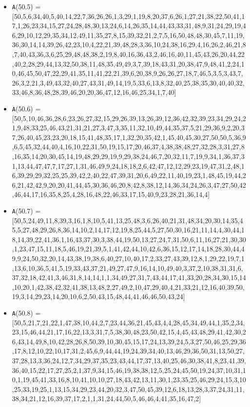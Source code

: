 \documentclass[runningheads,a4paper]{llncs}
\begin{document}
\begin{itemize}
	\item {\texttt A(50.5) = } [50,5,6,34,40,5,40,14,22,7,36,26,26,1,3,29,1,19,8,20,37,6,26,1,27,21,38,22,50,41,17,1,26,23,34,15,27,24,28,48,30,13,24,6,14,26,35,14,44,43,33,31,48,9,31,24,29,19,46,29,10,12,29,35,34,12,49,11,35,27,8,15,39,32,21,2,7,5,16,50,48,48,30,45,7,11,19,36,30,14,14,39,26,42,23,10,4,22,21,39,48,28,3,36,10,24,38,16,29,4,16,26,2,46,21,8,7,40,43,36,3,6,25,29,48,48,38,2,19,8,40,16,36,43,2,46,16,40,11,45,43,26,20,44,22,40,2,28,29,44,13,32,50,38,11,48,35,49,49,3,7,39,18,43,31,20,38,47,9,48,41,2,24,10,46,45,50,47,22,29,41,35,11,41,22,21,39,6,20,38,9,26,26,27,18,7,46,5,3,5,3,43,7,26,3,2,21,3,49,43,32,40,27,43,31,49,14,19,5,33,6,13,8,32,40,25,38,35,30,40,40,32,33,46,8,36,48,28,39,46,20,20,36,47,12,16,46,25,34,1,7,40]
	
	\item {\texttt A(50.6) = } [50,5,10,46,36,28,6,23,26,27,32,15,29,26,39,13,26,39,12,36,42,32,39,23,34,29,24,21,9,48,33,25,46,43,21,31,21,27,3,47,3,35,11,32,10,49,44,35,37,5,21,29,36,9,2,20,37,26,40,45,23,23,20,18,15,41,48,35,17,1,32,20,35,42,1,45,40,45,30,27,50,50,5,36,9,6,5,45,32,44,40,4,16,10,22,31,50,19,15,17,20,46,37,4,38,38,48,27,32,28,3,31,27,8,16,35,14,20,30,45,14,19,48,29,29,19,9,29,38,24,46,7,20,32,11,7,19,9,34,1,36,37,31,13,44,47,47,7,17,27,1,31,46,49,9,24,18,18,2,6,42,47,12,12,29,23,19,47,31,2,48,16,39,29,29,32,25,25,39,42,2,40,22,47,39,31,20,6,49,22,11,40,19,23,1,48,45,19,44,26,21,42,42,9,20,20,41,44,45,30,36,46,20,8,42,8,38,12,14,36,34,24,26,3,47,27,50,42,46,44,17,16,35,8,25,4,28,16,48,22,46,33,17,15,40,9,23,28,21,36,14,4]
	\item {\texttt A(50.7) = } [50,5,24,49,11,8,39,3,16,1,8,10,5,41,13,25,48,3,6,26,40,21,31,48,34,20,30,14,35,45,5,27,48,29,26,8,36,14,10,2,14,17,12,19,8,25,44,5,27,50,30,16,21,11,14,4,30,44,18,14,39,22,41,36,1,16,43,37,30,3,38,44,19,50,13,27,24,7,31,50,6,11,16,27,21,30,30,1,23,47,15,11,18,5,46,19,21,39,5,1,41,42,44,10,42,6,36,15,12,17,14,18,28,30,44,49,9,24,50,32,20,14,43,38,19,38,6,40,27,10,40,17,2,33,27,43,39,12,8,1,29,22,19,7,1,13,6,10,36,5,41,5,19,33,43,37,21,49,27,47,9,16,14,10,49,40,3,37,2,10,38,31,31,6,37,32,18,42,41,3,46,31,8,14,14,1,1,34,49,27,31,7,43,44,17,41,33,20,28,34,30,15,14,10,20,1,42,38,42,32,41,38,13,48,2,27,49,2,10,47,29,40,4,21,33,21,12,16,40,39,50,19,3,14,29,23,14,20,10,6,2,50,43,15,48,44,41,46,46,50,43,24]
	\item {\texttt A(50.8) = } [50,5,21,7,21,22,1,47,38,10,44,2,7,23,44,36,21,45,43,4,4,28,45,34,49,44,1,35,2,34,23,15,46,44,21,17,16,22,13,3,31,7,5,38,30,48,23,50,42,15,4,45,43,48,29,41,42,30,26,43,14,49,8,10,42,28,26,8,50,39,10,30,45,15,17,24,13,39,24,5,3,27,50,46,25,29,36,17,8,12,10,22,10,17,31,2,45,6,9,44,44,19,24,39,34,40,13,46,29,36,50,31,13,50,27,37,28,13,3,36,24,12,7,34,29,37,35,23,43,44,17,37,13,40,25,46,30,38,41,8,23,41,39,36,40,15,22,17,27,25,2,1,37,9,34,15,46,19,38,38,12,5,25,24,45,50,19,24,37,10,31,10,1,19,45,41,33,16,8,10,41,10,10,27,18,43,42,13,11,30,1,23,35,25,46,29,24,15,3,10,25,33,19,25,1,13,15,34,29,23,44,20,32,3,47,50,45,39,12,6,18,13,28,3,37,24,31,11,38,34,21,12,16,39,37,17,2,1,1,31,24,44,50,5,46,46,4,41,35,16,47,2]

\end{itemize}
\end{document}
